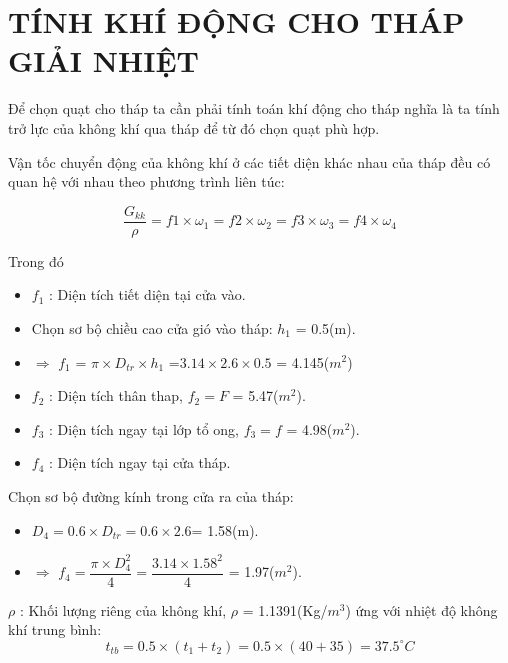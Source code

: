 \newpage
\section{TÍNH KHÍ ĐỘNG CHO THÁP GIẢI NHIỆT}
Để chọn quạt cho tháp ta cần phải tính toán khí động cho tháp nghĩa là ta tính trở lực của không khí qua tháp để từ đó chọn quạt phù hợp.

Vận tốc chuyển động của không khí ở các tiết diện khác nhau của tháp đều có quan hệ với nhau theo phương trình liên túc:

\begin{equation}
	\dfrac{G_{kk}}{\rho} = f1 \times \omega_{1} = f2 \times \omega_{2} = f3 \times \omega_{3} =f4 \times \omega_{4} 
\end{equation}

Trong đó
\begin{itemize}
	\item $f_{1}$ : Diện tích tiết diện tại cửa vào.
	\item Chọn sơ bộ chiều cao cửa gió vào tháp: $h_{1}$ = 0.5(m).
	\item $\Rightarrow$ $f_{1}$ = $\pi \times D_{tr} \times h_{1}$ =$3.14 \times 2.6 \times 0.5$ = 4.145($m^2$)
	\item $f_{2}$ : Diện tích thân thap, $f_{2} = F$ = 5.47($m^2$).
	\item $f_{3}$ : Diện tích ngay tại lớp tổ ong, $f_{3} = f$ = 4.98($m^2$).
	\item $f_{4}$ : Diện tích ngay tại cửa tháp.
\end{itemize}

Chọn sơ bộ đường kính trong cửa ra của tháp:
\begin{itemize}
	\item $D_{4} = 0.6 \times D_{tr} = 0.6 \times 2.6 $= 1.58(m).
	\item $\Rightarrow$ $f_{4} = \dfrac{\pi \times D_{4}^{2}}{4} = \dfrac{3.14 \times 1.58^2}{4}$ = 1.97($m^2$).
\end{itemize}

$\rho$ : Khối lượng riêng của không khí, $\rho$ = 1.1391(Kg/$m^3$) ứng với nhiệt độ không khí trung bình:
\begin{equation}
	t_{tb} = 0.5 \times (t_{1} + t_{2}) = 0.5 \times (40 + 35) = 37.5^{\circ}C
\end{equation}

\newpage

